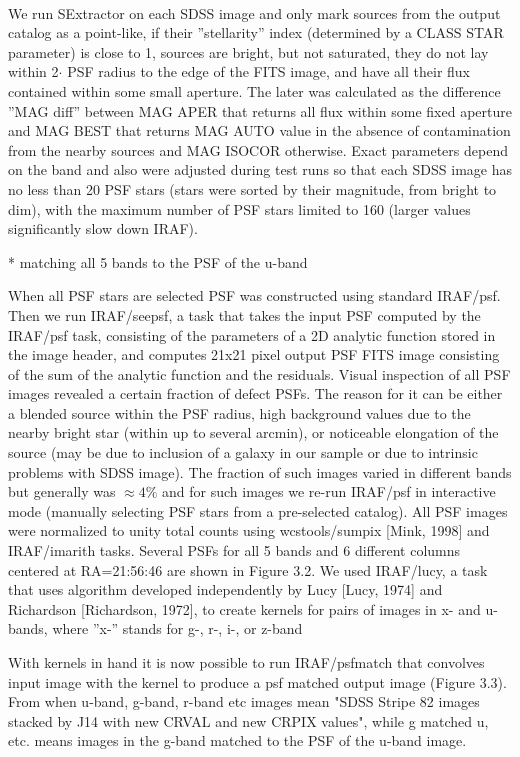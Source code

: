 \documentclass[numberedappendix,apj,twocolumn]{emulateapj}
\begin{document}
\\
We run SExtractor on each SDSS image and only mark sources from the output
catalog as a point-like, if their ”stellarity” index (determined by a CLASS STAR
parameter) is close to 1, sources are bright, but not saturated, they do not lay within
2$\cdot$ PSF radius to the edge of the FITS image, and have all their flux contained within
some small aperture. The later was calculated as the difference ”MAG diff” between MAG APER that returns all flux within some fixed aperture and MAG BEST that returns MAG AUTO value in the absence of contamination from the nearby
sources and MAG ISOCOR otherwise. Exact parameters depend on the band and
also were adjusted during test runs so that each SDSS image has no less than 20
PSF stars (stars were sorted by their magnitude, from bright to dim), with the maximum number of PSF stars limited to 160 (larger values significantly slow down IRAF).

 *	matching all 5 bands to the PSF of the u-band

When all PSF stars are selected PSF was constructed using standard IRAF/psf. Then we run IRAF/seepsf, a task that takes the input PSF computed by the IRAF/psf task, consisting of the parameters of
a 2D analytic function stored in the image header, and computes 21x21 pixel output
PSF FITS image consisting of the sum of the analytic function and the residuals.
Visual inspection of all PSF images revealed a certain fraction of defect PSFs. The
reason for it can be either a blended source within the PSF radius, high background
values due to the nearby bright star (within up to several arcmin), or noticeable
elongation of the source (may be due to inclusion of a galaxy in our sample or due to
intrinsic problems with SDSS image). The fraction of such images varied in different bands but generally was $\approx 4\%$ and for such images we re-run IRAF/psf in interactive mode (manually selecting PSF
stars from a pre-selected catalog). All PSF images were normalized to unity total counts using wcstools/sumpix [Mink, 1998] and IRAF/imarith tasks. Several PSFs for all 5 bands and 6 different
columns centered at RA=21:56:46 are shown in Figure 3.2. We used IRAF/lucy, a task that uses algorithm developed independently by Lucy
[Lucy, 1974] and Richardson [Richardson, 1972], to create kernels for pairs of images in x- and u-bands, where ”x-” stands for g-, r-, i-, or z-band
 
With kernels in hand it is now possible to run IRAF/psfmatch that convolves
input image with the kernel to produce a psf matched output image (Figure 3.3). From when u-band, g-band, r-band etc images mean "SDSS Stripe 82 images stacked by J14 with new CRVAL and new CRPIX values", while g matched u, etc. means images in the g-band matched to the PSF of the u-band image. 
 
\end{document}
